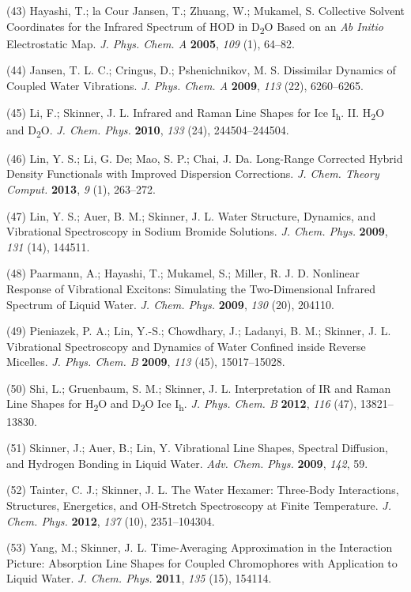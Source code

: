 \documentclass[]{article}
\begin{document}
(43) Hayashi, T.; la Cour Jansen, T.; Zhuang, W.; Mukamel, S. Collective
Solvent Coordinates for the Infrared Spectrum of HOD in
D\textsubscript{2}O Based on an \emph{Ab Initio} Electrostatic Map.
\emph{J. Phys. Chem. A} \textbf{2005}, \emph{109} (1), 64--82.

(44) Jansen, T. L. C.; Cringus, D.; Pshenichnikov, M. S. Dissimilar
Dynamics of Coupled Water Vibrations. \emph{J. Phys. Chem. A}
\textbf{2009}, \emph{113} (22), 6260--6265.

(45) Li, F.; Skinner, J. L. Infrared and Raman Line Shapes for Ice
I\textsubscript{h}. II. H\textsubscript{2}O and D\textsubscript{2}O.
\emph{J. Chem. Phys.} \textbf{2010}, \emph{133} (24), 244504--244504.

(46) Lin, Y. S.; Li, G. De; Mao, S. P.; Chai, J. Da. Long-Range
Corrected Hybrid Density Functionals with Improved Dispersion
Corrections. \emph{J. Chem. Theory Comput.} \textbf{2013}, \emph{9} (1),
263--272.

(47) Lin, Y. S.; Auer, B. M.; Skinner, J. L. Water Structure, Dynamics,
and Vibrational Spectroscopy in Sodium Bromide Solutions. \emph{J. Chem.
Phys.} \textbf{2009}, \emph{131} (14), 144511.

(48) Paarmann, A.; Hayashi, T.; Mukamel, S.; Miller, R. J. D. Nonlinear
Response of Vibrational Excitons: Simulating the Two-Dimensional
Infrared Spectrum of Liquid Water. \emph{J. Chem. Phys.} \textbf{2009},
\emph{130} (20), 204110.

(49) Pieniazek, P. A.; Lin, Y.-S.; Chowdhary, J.; Ladanyi, B. M.;
Skinner, J. L. Vibrational Spectroscopy and Dynamics of Water Confined
inside Reverse Micelles. \emph{J. Phys. Chem. B} \textbf{2009},
\emph{113} (45), 15017--15028.

(50) Shi, L.; Gruenbaum, S. M.; Skinner, J. L. Interpretation of IR and
Raman Line Shapes for H\textsubscript{2}O and D\textsubscript{2}O Ice
I\textsubscript{h}. \emph{J. Phys. Chem. B} \textbf{2012}, \emph{116}
(47), 13821--13830.

(51) Skinner, J.; Auer, B.; Lin, Y. Vibrational Line Shapes, Spectral
Diffusion, and Hydrogen Bonding in Liquid Water. \emph{Adv. Chem. Phys.}
\textbf{2009}, \emph{142}, 59.

(52) Tainter, C. J.; Skinner, J. L. The Water Hexamer: Three-Body
Interactions, Structures, Energetics, and OH-Stretch Spectroscopy at
Finite Temperature. \emph{J. Chem. Phys.} \textbf{2012}, \emph{137}
(10), 2351--104304.

(53) Yang, M.; Skinner, J. L. Time-Averaging Approximation in the
Interaction Picture: Absorption Line Shapes for Coupled Chromophores
with Application to Liquid Water. \emph{J. Chem. Phys.} \textbf{2011},
\emph{135} (15), 154114.
\end{document}
